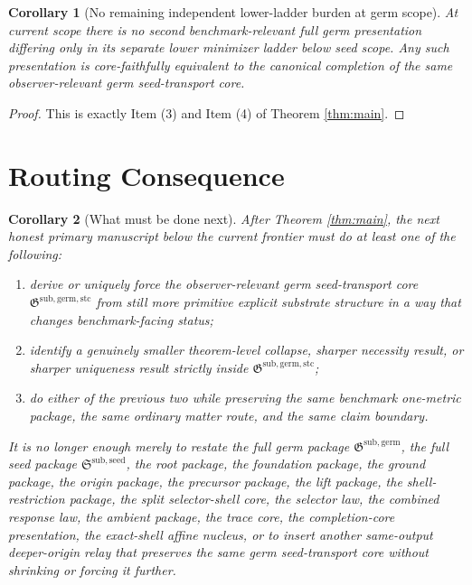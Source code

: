 \documentclass[11pt]{article}
\newcommand{\SeedPackage}{\mathfrak S^{\mathrm{sub,seed}}}
\newcommand{\GermPackage}{\mathfrak G^{\mathrm{sub,germ}}}
\newcommand{\GermTransportCore}{\mathfrak G^{\mathrm{sub,germ,stc}}}
\newtheorem{corollary}{Corollary}
\begin{document}
\begin{corollary}[No remaining independent lower-ladder burden at germ scope]
\label{cor:nofreedom}
At current scope there is no second benchmark-relevant full germ presentation differing only in its separate lower minimizer ladder below seed scope. Any such presentation is core-faithfully equivalent to the canonical completion of the same observer-relevant germ seed-transport core.
\end{corollary}

\begin{proof}
This is exactly Item (3) and Item (4) of Theorem \ref{thm:main}.
\end{proof}

\section{Routing Consequence}

\begin{corollary}[What must be done next]
\label{cor:next}
After Theorem \ref{thm:main}, the next honest primary manuscript below the current frontier must do at least one of the following:
\begin{enumerate}
    \item derive or uniquely force the observer-relevant germ seed-transport core \(\GermTransportCore\) from still more primitive explicit substrate structure in a way that changes benchmark-facing status;
    \item identify a genuinely smaller theorem-level collapse, sharper necessity result, or sharper uniqueness result strictly inside \(\GermTransportCore\);
    \item do either of the previous two while preserving the same benchmark one-metric package, the same ordinary matter route, and the same claim boundary.
\end{enumerate}
It is no longer enough merely to restate the full germ package \(\GermPackage\), the full seed package \(\SeedPackage\), the root package, the foundation package, the ground package, the origin package, the precursor package, the lift package, the shell-restriction package, the split selector-shell core, the selector law, the combined response law, the ambient package, the trace core, the completion-core presentation, the exact-shell affine nucleus, or to insert another same-output deeper-origin relay that preserves the same germ seed-transport core without shrinking or forcing it further.
\end{corollary}
\end{document}
